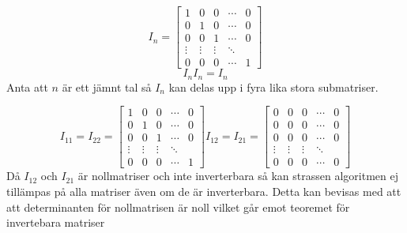 $$ I_n =
 \begin{bmatrix}
   1 & 0 & 0 & \cdots & 0 \\
  0 & 1 & 0 & \cdots & 0 \\
  0 & 0 & 1 & \cdots & 0 \\
  \vdots  & \vdots  & \vdots & \ddots  \\
  0 & 0 & 0 & \cdots & 1
 \end{bmatrix}
 $$
 $$I_nI_n=I_n$$
 Anta att $n$ är ett jämnt tal så $I_n$ kan delas upp i fyra lika stora submatriser.
 
  $$ I_{11}=I_{22} =
 \begin{bmatrix}
   1 & 0 & 0 & \cdots & 0 \\
  0 & 1 & 0 & \cdots & 0 \\
  0 & 0 & 1 & \cdots & 0 \\
  \vdots  & \vdots  & \vdots & \ddots  \\
  0 & 0 & 0 & \cdots & 1
 \end{bmatrix}
 I_{12}=I_{21}=
  \begin{bmatrix}
   0 & 0 & 0 & \cdots & 0 \\
  0 & 0 & 0 & \cdots & 0 \\
  0 & 0 & 0 & \cdots & 0 \\
  \vdots  & \vdots  & \vdots & \ddots  \\
  0 & 0 & 0 & \cdots & 0
 \end{bmatrix}
 $$
 Då $I_{12}$ och $I_{21}$ är nollmatriser och inte inverterbara så kan strassen algoritmen ej tillämpas på alla matriser även om de är inverterbara. Detta kan bevisas med att att determinanten för nollmatrisen är noll vilket går emot teoremet för invertebara matriser \cite{Setyadi} 
 
